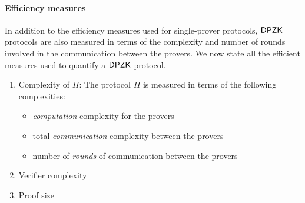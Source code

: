 \paragraph{Efficiency measures}
In addition to the efficiency measures used for single-prover protocols, $\mathsf{DPZK}$ protocols are also measured in terms of the complexity and number of rounds involved in the communication between the provers. We now state all the efficient measures used to quantify a $\mathsf{DPZK}$ protocol.
\begin{enumerate}
\item Complexity of $\Pi$: The protocol $\Pi$ is measured in terms of the following complexities:
\begin{itemize}
\item \textit{computation} complexity for the provers
\item total \textit{communication} complexity between the provers
\item number of \textit{rounds} of communication between the provers
\end{itemize}
\item Verifier complexity
\item Proof size
\end{enumerate}

